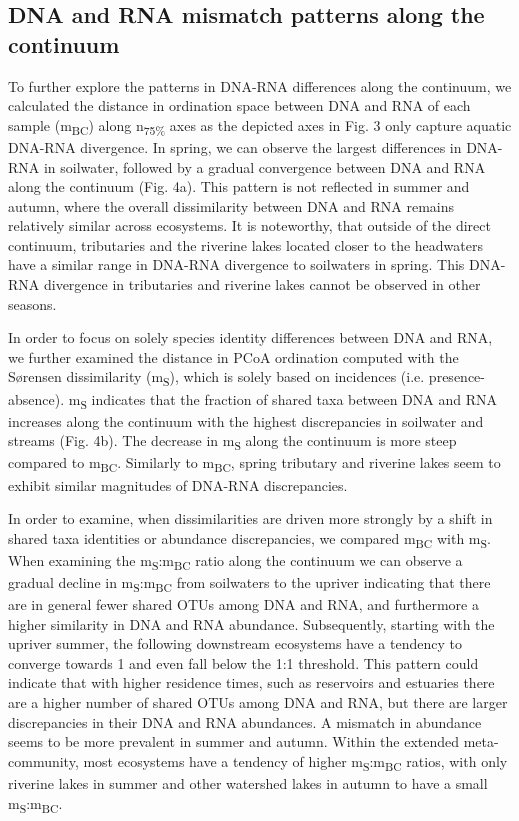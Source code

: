 \documentclass[12pt,a4paper]{article} %
\begin{document}
\subsection*{DNA and RNA mismatch patterns along the continuum}
To further explore the patterns in DNA-RNA differences along the continuum, we calculated the distance in ordination space between DNA and RNA of each sample (m\textsubscript{BC}) along n\textsubscript{75\%} axes as the depicted axes in Fig. 3 only capture aquatic DNA-RNA divergence. In spring, we can observe the largest differences in DNA-RNA in soilwater, followed by a gradual convergence between DNA and RNA along the continuum (Fig. 4a). This pattern is not reflected in summer and autumn, where the overall dissimilarity between DNA and RNA remains relatively similar across ecosystems. It is noteworthy, that outside of the direct continuum, tributaries and the riverine lakes located closer to the headwaters have a similar range in DNA-RNA divergence to soilwaters in spring. This DNA-RNA divergence in tributaries and riverine lakes cannot be observed in other seasons.

In order to focus on solely species identity differences between DNA and RNA, we further examined the distance in PCoA ordination computed with the S{\o}rensen dissimilarity (m\textsubscript{S}), which is solely based on incidences (i.e. presence-absence). m\textsubscript{S} indicates that the fraction of shared taxa between DNA and RNA increases along the continuum with the highest discrepancies in soilwater and streams (Fig. 4b). The decrease in m\textsubscript{S} along the continuum is more steep compared to m\textsubscript{BC}. Similarly to m\textsubscript{BC}, spring tributary and riverine lakes seem to exhibit similar magnitudes of DNA-RNA discrepancies.

In order to examine, when dissimilarities are driven more strongly by a shift in shared taxa identities or abundance discrepancies, we compared m\textsubscript{BC} with m\textsubscript{S}. When examining the m\textsubscript{S}:m\textsubscript{BC} ratio along the continuum we can observe a gradual decline in m\textsubscript{S}:m\textsubscript{BC} from soilwaters to the upriver indicating that there are in general fewer shared OTUs among DNA and RNA, and furthermore a higher similarity in DNA and RNA abundance. Subsequently, starting with the upriver summer, the following downstream ecosystems have a tendency to converge towards 1 and even fall below the 1:1 threshold. This pattern could indicate that with higher residence times, such as reservoirs and estuaries there are a higher number of shared OTUs among DNA and RNA, but there are larger discrepancies in their DNA and RNA abundances. A mismatch in abundance seems to be more prevalent in summer and autumn. Within the extended meta-community, most ecosystems have a tendency of higher m\textsubscript{S}:m\textsubscript{BC} ratios, with only riverine lakes in summer and other watershed lakes in autumn to have a small m\textsubscript{S}:m\textsubscript{BC}.
\end{document}
